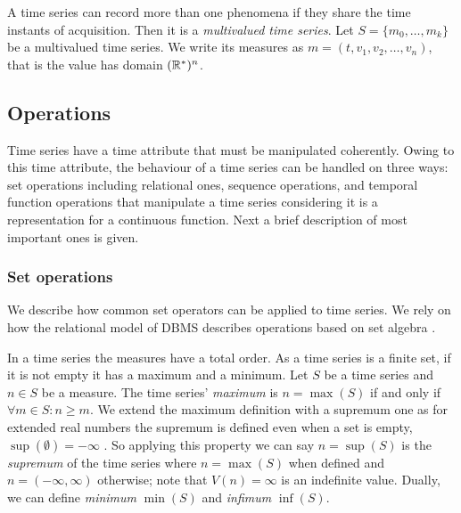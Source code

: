 A time series can record more than one phenomena if they share the
time instants of acquisition. Then it is a \emph{multivalued time
  series}. Let $S = \{m_0, \ldots, m_k\}$ be a multivalued time
series. We write its measures as $m=(t,v_1,v_2,\ldots,v_n)$, that is
the value has domain $(\mathbb{R}^{*})^n$.




\subsection{Operations}
\label{sec:model:operations}

Time series have a time attribute that must be manipulated
coherently. Owing to this time attribute, the behaviour of a time
series can be handled on three ways:  set operations including
relational ones,  sequence operations, and  temporal function
operations that manipulate a time series considering it is a
representation for a continuous function. Next a brief description of
most important ones is given.




\subsubsection{Set operations}

We describe how common set operators can be applied to time series. We
rely on how the relational model of DBMS describes operations based on
set algebra \cite{date:introduction}.


In a time series the measures have a total order.  As a time series is
a finite set, if it is not empty it has a maximum and a minimum.  Let
$S$ be a time series and $n\in S$ be a measure. The time series'
\emph{maximum} is $n=\max(S)$ if and only if $\forall m \in S: n \geq
m $.  We extend the maximum definition with a supremum one as for
extended real numbers the supremum is defined even when a set is
empty, $\sup(\emptyset)=-\infty$ \cite{cantrell:extendedreal}. So
applying this property we can say $n=\sup(S)$ is the \emph{supremum}
of the time series where $n=\max(S)$ when defined and
$n=(-\infty,\infty)$ otherwise; note that $V(n)=\infty$ is an
indefinite value.  Dually, we can define \emph{minimum} $\min(S)$ and
\emph{infimum} $\inf(S)$.


